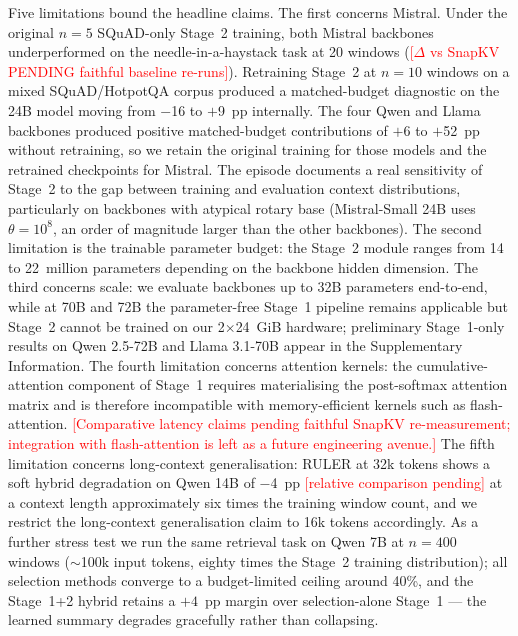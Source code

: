 \documentclass[sn-nature,Numbered]{sn-jnl}
\begin{document}
Five limitations bound the headline claims. The first concerns Mistral. Under the original $n{=}5$ SQuAD-only Stage~2 training, both Mistral backbones underperformed on the needle-in-a-haystack task at 20 windows (\textcolor{red}{[$\Delta$ vs SnapKV PENDING faithful baseline re-runs]}). Retraining Stage~2 at $n{=}10$ windows on a mixed SQuAD/HotpotQA corpus produced a matched-budget diagnostic on the 24B model moving from $-$16 to $+$9~pp internally. The four Qwen and Llama backbones produced positive matched-budget contributions of $+$6 to $+$52~pp without retraining, so we retain the original training for those models and the retrained checkpoints for Mistral. The episode documents a real sensitivity of Stage~2 to the gap between training and evaluation context distributions, particularly on backbones with atypical rotary base (Mistral-Small 24B uses $\theta{=}10^8$, an order of magnitude larger than the other backbones). The second limitation is the trainable parameter budget: the Stage~2 module ranges from 14 to 22~million parameters depending on the backbone hidden dimension. The third concerns scale: we evaluate backbones up to 32B parameters end-to-end, while at 70B and 72B the parameter-free Stage~1 pipeline remains applicable but Stage~2 cannot be trained on our 2$\times$24~GiB hardware; preliminary Stage~1-only results on Qwen 2.5-72B and Llama 3.1-70B appear in the Supplementary Information. The fourth limitation concerns attention kernels: the cumulative-attention component of Stage~1 requires materialising the post-softmax attention matrix and is therefore incompatible with memory-efficient kernels such as flash-attention. \textcolor{red}{[Comparative latency claims pending faithful SnapKV re-measurement; integration with flash-attention is left as a future engineering avenue.]} The fifth limitation concerns long-context generalisation: RULER at 32k tokens shows a soft hybrid degradation on Qwen 14B of $-$4~pp \textcolor{red}{[relative comparison pending]} at a context length approximately six times the training window count, and we restrict the long-context generalisation claim to 16k tokens accordingly. As a further stress test we run the same retrieval task on Qwen 7B at $n{=}400$ windows ($\sim$100k input tokens, eighty times the Stage~2 training distribution); all selection methods converge to a budget-limited ceiling around 40\%, and the Stage~1+2 hybrid retains a $+4$~pp margin over selection-alone Stage~1 — the learned summary degrades gracefully rather than collapsing.
\end{document}
